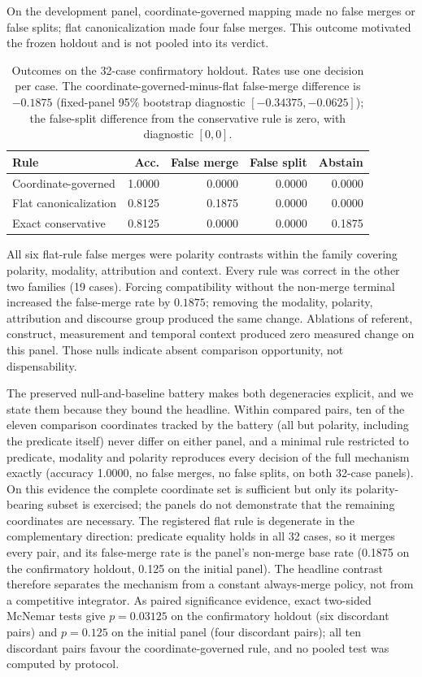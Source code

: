 On the development panel, coordinate-governed mapping made no false merges or
false splits; flat canonicalization made four false merges. This outcome
motivated the frozen holdout and is not pooled into its verdict.

\begin{table}[H]
\centering
\footnotesize
\begin{tabular}{@{}lrrrr@{}}
\toprule
\textbf{Rule} & \textbf{Acc.} & \textbf{False merge} & \textbf{False split} & \textbf{Abstain} \\
\midrule
Coordinate-governed & 1.0000 & 0.0000 & 0.0000 & 0.0000 \\
Flat canonicalization & 0.8125 & 0.1875 & 0.0000 & 0.0000 \\
Exact conservative & 0.8125 & 0.0000 & 0.0000 & 0.1875 \\
\bottomrule
\end{tabular}
\caption{Outcomes on the 32-case confirmatory holdout. Rates use one decision
per case. The coordinate-governed-minus-flat false-merge difference is
$-0.1875$ (fixed-panel 95\% bootstrap diagnostic
$[-0.34375,-0.0625]$); the false-split difference from the conservative rule is
zero, with diagnostic $[0,0]$.}
\label{tab:results}
\end{table}

All six flat-rule false merges were polarity contrasts within the family
covering polarity, modality, attribution and context. Every rule was correct in the other two families (19 cases). Forcing compatibility without the non-merge terminal increased
the false-merge rate by $0.1875$; removing the modality, polarity, attribution
and discourse group produced the same change. Ablations of referent, construct,
measurement and temporal context produced zero measured change on this panel.
Those nulls indicate absent comparison opportunity, not dispensability.

The preserved null-and-baseline battery makes both degeneracies explicit, and
we state them because they bound the headline. Within compared pairs, ten of
the eleven comparison coordinates tracked by the battery (all but polarity,
including the predicate itself) never differ on either panel, and a minimal rule
restricted to predicate, modality and polarity reproduces every decision of
the full mechanism exactly (accuracy 1.0000, no false merges, no false splits,
on both 32-case panels). On this evidence the complete coordinate set is
sufficient but only its polarity-bearing subset is exercised; the panels do
not demonstrate that the remaining coordinates are necessary. The registered
flat rule is degenerate in the complementary direction: predicate equality
holds in all 32 cases, so it merges every pair, and its false-merge rate is
the panel's non-merge base rate (0.1875 on the confirmatory holdout, 0.125 on
the initial panel). The headline contrast therefore separates the mechanism
from a constant always-merge policy, not from a competitive integrator. As
paired significance evidence, exact two-sided McNemar tests give $p=0.03125$
on the confirmatory holdout (six discordant pairs) and $p=0.125$ on the
initial panel (four discordant pairs); all ten discordant pairs favour the
coordinate-governed rule, and no pooled test was computed by protocol.

